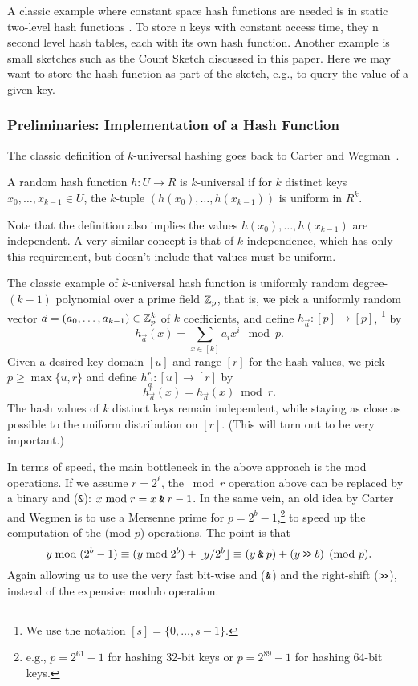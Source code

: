 A classic example where constant space hash functions are needed is in
static two-level hash functions \cite{FKS84}.  To store n keys with
constant access time, they n second level hash tables, each with its
own hash function.  Another example is small sketches such as the
Count Sketch \cite{charikar04count-sketch} discussed in this
paper. Here we may want to store the hash function as part of the
sketch, e.g., to query the value of a given key.


\subsubsection{Preliminaries: Implementation of a Hash Function}
The classic definition of $k$-universal hashing
goes back to Carter and Wegman~\cite{wegman81kwise}.
\begin{definition}
   A random hash function $h:U\to R$ is $k$-universal if for $k$
   distinct keys $x_0,\ldots,x_{k-1}\in U$, the $k$-tuple
   $(h(x_0),\ldots,h(x_{k-1}))$ is uniform in $R^k$.
\end{definition}
\noindent
Note that the definition also implies the values 
$h(x_0),\ldots,h(x_{k-1})$ are independent.
A very similar concept is that of $k$-independence, which has only this requirement, but doesn't include that values must be uniform.

The classic example of $k$-universal
hash function is uniformly random degree-$(k-1)$ polynomial over a prime field
$\mathbb Z_p$, that is, we pick a uniformly random vector
$\vec a=(a_0,\ldots,a_{k-1})\in \mathbb Z_p^k$ of $k$ coefficients, and define
$h_{\vec a}:[p]\to[p]$,
\footnote{ We use the notation $[s]=\{0,\ldots,s-1\}$.  }
   by 
\[h_{\vec a}(x)=\sum_{x\in[k]}a_i x^i \mod p.\]
%
Given a desired key domain $[u]$ and range $[r]$ for the hash values, we pick
$p\geq \max\{u,r\}$ and define
$h^r_{\vec a}:[u]\to[r]$ by
\[h^r_{\vec a}(x)=h_{\vec a}(x)\bmod r.\]
The  hash values of $k$ distinct keys remain independent,
while staying as close as possible to the uniform distribution on $[r]$.
(This will turn out to be very important.)

In terms of speed, the main bottleneck in the above approach is the mod operations.
If we assume $r=2^\ell$, the $\bmod r$ operation above can be replaced by a binary {\sc and} (\texttt{\&}): $x \bmod r = x \mathbin{\texttt{\&}} r-1$.
In the same vein, an old idea by 
Carter and Wegmen \cite{carter77universal} is to use a
Mersenne prime for $p=2^b-1$,\footnote{e.g., $p=2^{61}-1$ for hashing 32-bit keys or
$p=2^{89}-1$ for hashing 64-bit keys.}
to speed up the computation of the (mod $p$) operations.
The point is that
\begin{equation}
   y \bmod (2^b-1)
   \equiv (y\bmod 2^{b}) + \lfloor {y/2^b} \rfloor
   \equiv (y \mathbin{\texttt{\&}} p) + (y \mathbin{\texttt{>\!>}} b)
   \pmod {p}.
   \label{eq:Mersenne}
\end{equation}
Again allowing us to use the very fast bit-wise {\sc and} ($\mathbin{\texttt{\&}}$) and the right-shift ($\mathbin{\texttt{>\!>}}$),
instead of the expensive modulo operation.


